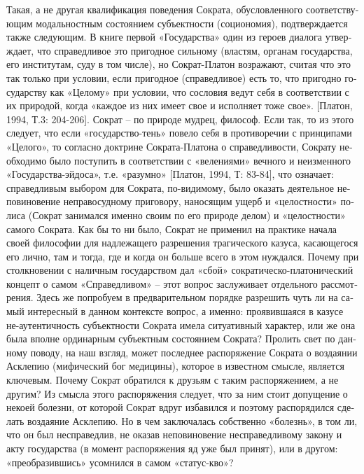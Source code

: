 \begin{russian}
    Такая, а не другая квалификация поведения Сократа, обусловленного соответствующим модальностным состоянием субъектности (социономия), подтверждается также следующим. В книге первой «Государства» один из героев диалога утверждает, что справедливое это пригодное сильному (властям, органам государства, его институтам, суду в том числе), но Сократ-Платон возражают, считая что это так только при условии, если пригодное (справедливое)  есть то, что пригодно государству как «Целому» при условии, что сословия ведут себя в соответствии с их природой, когда «каждое из них имеет свое и исполняет тоже свое». [Платон, 1994, Т.3: 204-206]. Сократ – по природе мудрец, философ. Если так, то из этого следует, что если «государство-тень» повело себя в противоречии с принципами «Целого», то согласно доктрине Сократа-Платона о справедливости, Сократу необходимо было поступить в соответствии с «велениями» вечного и неизменного «Государства-эйдоса»,  т.е. «разумно» [Платон, 1994, Т: 83-84], что означает: справедливым выбором для Сократа, по-видимому, было оказать деятельное неповиновение неправосудному приговору, наносящим ущерб и «целостности» полиса (Сократ занимался именно своим по его природе делом) и «целостности» самого Сократа. Как бы то ни было, Сократ не применил на практике начала своей философии для надлежащего разрешения трагического казуса, касающегося его лично, там и тогда, где и когда он больше всего в этом нуждался.
    Почему при столкновении с наличным государством дал «сбой» сократическо-платонический концепт о самом «Справедливом» – этот вопрос заслуживает отдельного рассмотрения. Здесь же попробуем в предварительном порядке разрешить чуть ли на самый интересный в данном контексте вопрос, а именно: проявившаяся в казусе не-аутентичность субъектности Сократа имела ситуативный характер, или же она была вполне ординарным субъектным состоянием Сократа? 
    Пролить свет по данному поводу, на наш взгляд, может последнее распоряжение Сократа о воздаянии Асклепию (мифический бог медицины), которое в известном смысле, является ключевым. Почему Сократ обратился к друзьям с таким распоряжением, а не другим? Из смысла этого распоряжения следует, что за ним стоит допущение о некоей болезни, от которой Сократ вдруг избавился и поэтому распорядился сделать воздаяние Асклепию. Но в чем заключалась собственно «болезнь», в том ли, что он был несправедлив, не оказав неповиновение несправедливому закону и акту государства (в момент распоряжения яд уже был принят), или в другом:  «преобразившись»  усомнился в самом «статус-кво»? 

\end{russian}
